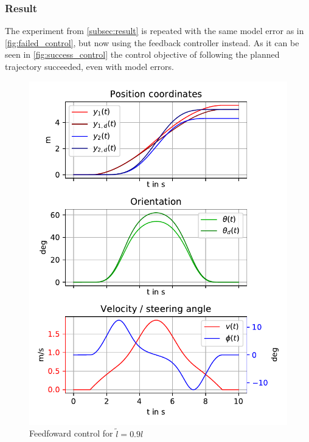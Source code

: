 \documentclass[a4paper,11pt,headings=standardclasses,parskip=half]{scrartcl}
\begin{document}
\subsubsection{Result}
The experiment from \ref{subsec:result} is repeated with the same model error as in \autoref{fig:failed_control}, but now using the feedback controller instead. As it can be seen in \autoref{fig:success_control} the control objective of following the planned trajectory succeeded, even with model errors.
\begin{figure}[ht]
\centering
\includegraphics[scale=1]{img/failedcontrol.pdf}
\caption{Feedfoward control for $\tilde{l}=0.9l$}
\label{fig:failed_control}
\end{figure}
\end{document}
